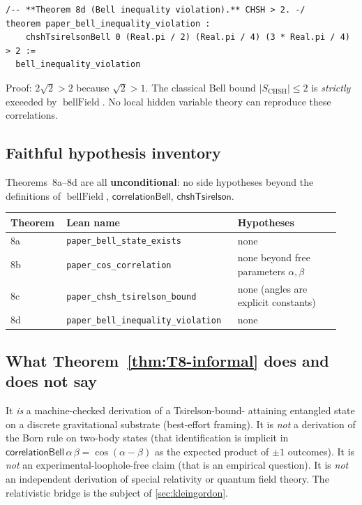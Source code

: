 \documentclass[11pt,a4paper,twoside]{article}
\theoremstyle{definition}
\newcommand{\code}[1]{\texttt{#1}}
\newcommand{\BellField}{\operatorname{bellField}}
\begin{document}
\begin{lstlisting}
/-- **Theorem 8d (Bell inequality violation).** CHSH > 2. -/
theorem paper_bell_inequality_violation :
    chshTsirelsonBell 0 (Real.pi / 2) (Real.pi / 4) (3 * Real.pi / 4) > 2 :=
  bell_inequality_violation
\end{lstlisting}

Proof: $2\sqrt{2}>2$ because $\sqrt{2}>1$. The classical Bell bound
$|S_{\mathrm{CHSH}}|\le 2$ is \emph{strictly} exceeded by
$\BellField$. No local hidden variable theory can reproduce these
correlations.

\subsection{Faithful hypothesis inventory}\label{sec:T8-hyp}

Theorems~8a--8d are all \textbf{unconditional}: no side hypotheses
beyond the definitions of $\BellField$,
$\mathsf{correlationBell}$, $\mathsf{chshTsirelson}$.

\begin{longtable}{@{}p{0.16\linewidth} p{0.48\linewidth} p{0.30\linewidth}@{}}
\toprule
Theorem & Lean name & Hypotheses \\
\midrule
\endhead
8a & \code{paper\_bell\_state\_exists} & none \\
8b & \code{paper\_cos\_correlation} & none beyond free parameters $\alpha,\beta$ \\
8c & \code{paper\_chsh\_tsirelson\_bound} & none (angles are explicit constants) \\
8d & \code{paper\_bell\_inequality\_violation} & none \\
\bottomrule
\end{longtable}

\subsection{What Theorem~\ref{thm:T8-informal} does and does not
say}\label{sec:T8-neg}

It \emph{is} a machine-checked derivation of a Tsirelson-bound-
attaining entangled state on a discrete gravitational substrate
(best-effort framing). It is \emph{not} a derivation of the Born
rule on two-body states (that identification is implicit in
$\mathsf{correlationBell}\,\alpha\,\beta=\cos(\alpha-\beta)$ as the
expected product of $\pm 1$ outcomes). It is \emph{not} an
experimental-loophole-free claim (that is an empirical question). It
is \emph{not} an independent derivation of special relativity or
quantum field theory. The relativistic bridge is the subject of
\cref{sec:kleingordon}.
\end{document}
